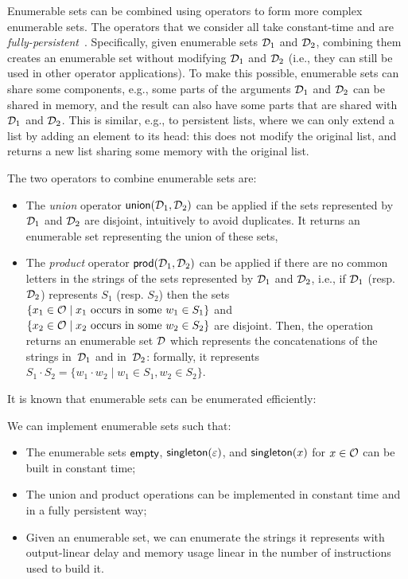 Enumerable sets can be combined using operators to form more complex
enumerable sets. The operators that we consider all take constant-time
and are {\em
fully-persistent}~\cite{driscoll1986making}. Specifically, given
enumerable sets $\mathcal{D}_1$ and $\mathcal{D}_2$, combining them creates an
enumerable set without modifying $\mathcal{D}_1$ and $\mathcal{D}_2$ (i.e., they can still be
used in other operator applications). To make this
possible, enumerable sets can share some components, e.g., some parts
of the arguments $\mathcal{D}_1$ and $\mathcal{D}_2$ can be shared in memory, and
the result can also have some parts that are shared with
$\mathcal{D}_1$ and $\mathcal{D}_2$. This is similar, e.g., to persistent lists,
where we can only extend a list by adding an element to its head: this
does not modify the original list, and returns a new
list sharing some memory with the original list.
%
%
%

The two operators to combine enumerable sets are:

\begin{itemize}
  \item The \emph{union} operator $\textsf{union}(\mathcal{D}_1, \mathcal{D}_2)$ can
    be applied if the sets represented by $\mathcal{D}_1$ and $\mathcal{D}_2$ are
    disjoint, intuitively to avoid duplicates. It returns an enumerable set representing the
    union of these sets,
    
  \item The \emph{product} operator $\textsf{prod}(\mathcal{D}_1, \mathcal{D}_2)$
    can be applied if there are no common letters in the strings of
    the sets represented by $\mathcal{D}_1$ and $\mathcal{D}_2$, i.e., if $\mathcal{D}_1$
    (resp. $\mathcal{D}_2$) represents $S_1$ (resp. $S_2$) then the sets
    $\{x_1 \in \mathcal{O} \mid x_1 \text{~occurs~in~some~} w_1 \in S_1\}$ and
    $\{x_2 \in \mathcal{O} \mid x_2 \text{~occurs~in~some~} w_2 \in S_2\}$ are
    disjoint.  Then, the operation returns an enumerable set $\mathcal{D}$
    which represents the concatenations of the strings in~$\mathcal{D}_1$ and
    in~$\mathcal{D}_2$: formally, it represents $S_1 \cdot S_2 = \{w_1 \cdot w_2 \mid
    w_1 \in S_1, w_2 \in S_2\}$.
\end{itemize}

%
%

It is known that enumerable sets can be enumerated efficiently:

\begin{theorem}
  \label{thm:enum}
  We can implement enumerable sets such that:
\begin{itemize} \item The enumerable
        sets $\mathsf{empty}$, $\textsf{singleton}(\varepsilon)$, and $\textsf{singleton}(x)$ for $x \in \mathcal{O}$ can be built in
  constant time;
\item The union and product
  operations can be implemented in constant time and in a fully
  persistent way;
\item Given an enumerable set,  we can enumerate the strings
      it represents with output-linear delay and memory usage linear
  in the number of instructions used to build it.
\end{itemize}
\end{theorem}

